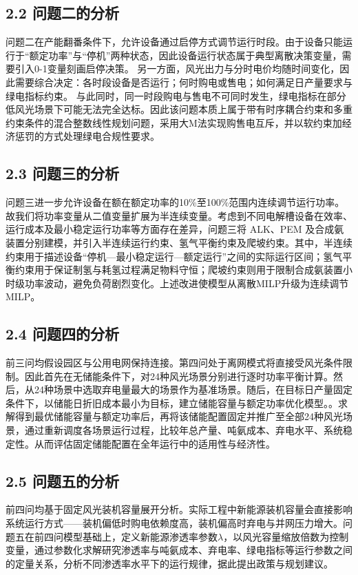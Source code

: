 \documentclass[zihao=-4,a4paper]{ctexart} %
\begin{document}
	\subsection*{2.2 问题二的分析}
	
	问题二在产能翻番条件下，允许设备通过启停方式调节运行时段。由于设备只能运行于“额定功率”与“停机”两种状态，因此设备运行状态属于典型离散决策变量，需要引入0-1变量刻画启停决策。
	另一方面，风光出力与分时电价均随时间变化，因此需要综合决定：各时段设备是否运行；何时购电或售电；如何满足日产量要求与绿电指标约束。
	与此同时，同一时段购电与售电不可同时发生，绿电指标在部分低风光场景下可能无法完全达标。因此该问题本质上属于带有时序耦合约束和多重约束条件的混合整数线性规划问题，采用大M法实现购售电互斥，并以软约束加经济惩罚的方式处理绿电合规性要求。
	
	\subsection*{2.3 问题三的分析}
	
	问题三进一步允许设备在额在额定功率的10\%至100\%范围内连续调节运行功率。故我们将功率变量从二值变量扩展为半连续变量。考虑到不同电解槽设备在效率、运行成本及最小稳定运行功率等方面存在差异，问题三将 ALK、PEM 及合成氨装置分别建模，并引入半连续运行约束、氢气平衡约束及爬坡约束。其中，半连续约束用于描述设备“停机—最小稳定运行—额定运行”之间的实际运行区间；氢气平衡约束用于保证制氢与耗氢过程满足物料守恒；爬坡约束则用于限制合成氨装置小时级功率波动，避免负荷剧烈变化。上述改进使模型从离散MILP升级为连续调节MILP。
	
	\subsection*{2.4 问题四的分析}
	
	前三问均假设园区与公用电网保持连接。第四问处于离网模式将直接受风光条件限制。因此首先在无储能条件下，对24种风光场景分别进行逐时功率平衡计算。然后，从24种场景中选取弃电量最大的场景作为基准场景。随后，在目标日产量固定条件下，以储能日折旧成本最小为目标，建立储能容量与额定功率优化模型。。求解得到最优储能容量与额定功率后，再将该储能配置固定并推广至全部24种风光场景，通过重新调度各场景运行过程，比较年总产量、吨氨成本、弃电水平、系统稳定性。从而评估固定储能配置在全年运行中的适用性与经济性。
	
	\subsection*{2.5 问题五的分析}
	
	前四问均基于固定风光装机容量展开分析。实际工程中新能源装机容量会直接影响系统运行方式——装机偏低时购电依赖度高，装机偏高时弃电与并网压力增大。问题五在前四问模型基础上，定义新能源渗透率参数$\lambda$，以风光容量缩放倍数为控制变量，通过参数化求解研究渗透率与吨氨成本、弃电率、绿电指标等运行参数之间的定量关系，分析不同渗透率水平下的运行规律，据此提出政策与规划建议。
	
\end{document}
